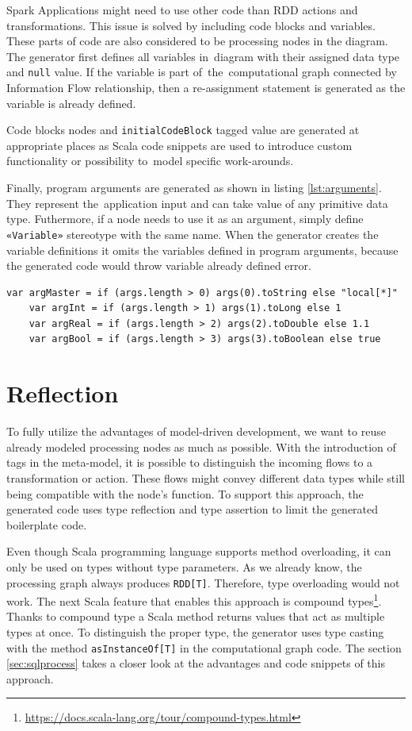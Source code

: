 Spark Applications might need to use other code than RDD actions and transformations. This issue is solved by including code blocks and variables. These parts of code are also considered to be processing nodes in the diagram. The generator first defines all variables in~diagram with their assigned data type and \texttt{null} value. If the variable is part of~the~computational graph connected by Information Flow relationship, then a re-assignment statement is generated as the variable is already defined. 

Code blocks nodes and \texttt{initialCodeBlock} tagged value are generated at appropriate places as Scala code snippets are used to introduce custom functionality or possibility to~model specific work-arounds. 

Finally, program arguments are generated as shown in listing \ref{lst:arguments}. They represent the~application input and can take value of any primitive data type. Futhermore, if a node needs to use it as an argument, simply define \texttt{«Variable»} stereotype with the same name. When the generator creates the variable definitions it omits the variables defined in program arguments, because the generated code would throw variable already defined error. 

\begin{lstlisting}[style=myScalastyle, caption={Generated program arguments}, label={lst:arguments}]
    var argMaster = if (args.length > 0) args(0).toString else "local[*]"
    var argInt = if (args.length > 1) args(1).toLong else 1
    var argReal = if (args.length > 2) args(2).toDouble else 1.1
    var argBool = if (args.length > 3) args(3).toBoolean else true
\end{lstlisting}


\section{Reflection}
\label{sec:reflection}
To fully utilize the advantages of model-driven development, we want to reuse already modeled processing nodes as much as possible. With the introduction of tags in the meta-model, it is possible to distinguish the incoming flows to a transformation or action. These flows might convey different data types while still being compatible with the node's function. To support this approach, the generated code uses type reflection and type assertion to limit the generated boilerplate code. 

Even though Scala programming language supports method overloading, it can only be used on types without type parameters. As we already know, the processing graph always produces \texttt{RDD[T]}. Therefore, type overloading would not work. The next Scala feature that enables this approach is compound types\footnote{\url{https://docs.scala-lang.org/tour/compound-types.html}}. Thanks to compound type a Scala method returns values that act as multiple types at once. To distinguish the proper type, the generator uses type casting with the method \texttt{asInstanceOf[T]} in the computational graph code. 
The section \ref{sec:sqlprocess} takes a closer look at the advantages and code snippets of this approach.


